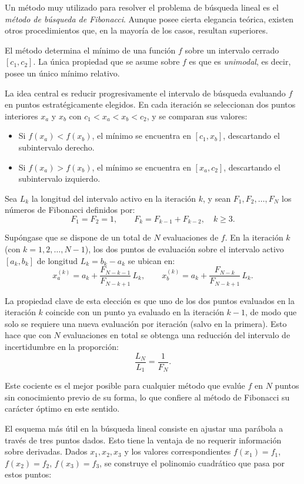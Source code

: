 \documentclass[11pt]{article}
\theoremstyle{ejstyle}
\theoremstyle{ejstyle}
\theoremstyle{ejstyle}
\theoremstyle{ejstyle}
\theoremstyle{ejstyle}
\theoremstyle{ejstyle}
\theoremstyle{ejstyle}
\begin{document}
	Un método muy utilizado para resolver el problema de búsqueda lineal es el \emph{método de búsqueda de Fibonacci}. Aunque posee cierta elegancia teórica, existen otros procedimientos que, en la mayoría de los casos, resultan superiores.
	
	El método determina el mínimo de una función $f$ sobre un intervalo cerrado $[c_1, c_2]$. La única propiedad que se asume sobre $f$ es que es \emph{unimodal}, es decir, posee un único mínimo relativo.
	
	
	La idea central es reducir progresivamente el intervalo de búsqueda evaluando $f$ en puntos estratégicamente elegidos. En cada iteración se seleccionan dos puntos interiores $x_a$ y $x_b$ con $c_1 < x_a < x_b < c_2$, y se comparan sus valores:
	
	\begin{itemize}
		\item Si $f(x_a) < f(x_b)$, el mínimo se encuentra en $[c_1, x_b]$, descartando el subintervalo derecho.
		\item Si $f(x_a) > f(x_b)$, el mínimo se encuentra en $[x_a, c_2]$, descartando el subintervalo izquierdo.
	\end{itemize}
	
	
	Sea $L_k$ la longitud del intervalo activo en la iteración $k$, y sean $F_1, F_2, \ldots, F_N$ los números de Fibonacci definidos por:
	\[
	F_1 = F_2 = 1, \qquad F_k = F_{k-1} + F_{k-2}, \quad k \geq 3.
	\]
	
	Supóngase que se dispone de un total de $N$ evaluaciones de $f$. En la iteración $k$ (con $k = 1, 2, \ldots, N-1$), los dos puntos de evaluación sobre el intervalo activo $[a_k, b_k]$ de longitud $L_k = b_k - a_k$ se ubican en:
	\[
	x_a^{(k)} = a_k + \frac{F_{N-k-1}}{F_{N-k+1}}\, L_k, \qquad
	x_b^{(k)} = a_k + \frac{F_{N-k}}{F_{N-k+1}}\, L_k.
	\]
	
	La propiedad clave de esta elección es que uno de los dos puntos evaluados en la iteración $k$ coincide con un punto ya evaluado en la iteración $k-1$, de modo que solo se requiere una nueva evaluación por iteración (salvo en la primera). Esto hace que con $N$ evaluaciones en total se obtenga una reducción del intervalo de incertidumbre en la proporción:
	\[
	\frac{L_N}{L_1} = \frac{1}{F_N}.
	\]
	
	Este cociente es el mejor posible para cualquier método que evalúe $f$ en $N$ puntos sin conocimiento previo de su forma, lo que confiere al método de Fibonacci su carácter óptimo en este sentido.
	
	El esquema más útil en la búsqueda lineal consiste en ajustar una parábola a través de tres puntos dados. Esto tiene la ventaja de no requerir información sobre derivadas. Dados $x_1, x_2, x_3$ y los valores correspondientes $f(x_1) = f_1$, $f(x_2) = f_2$, $f(x_3) = f_3$, se construye el polinomio cuadrático que pasa por estos puntos:
	
\end{document}
